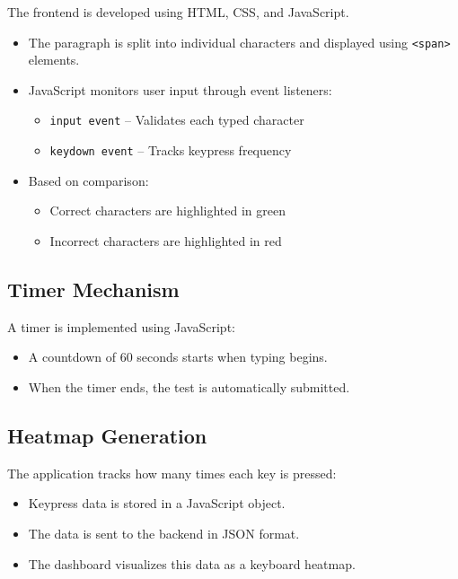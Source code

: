 \documentclass[a4paper,12pt]{article}
\begin{document}
The frontend is developed using HTML, CSS, and JavaScript.

\begin{itemize}
    \item The paragraph is split into individual characters and displayed using \texttt{<span>} elements.
    
    \item JavaScript monitors user input through event listeners:
    \begin{itemize}
        \item \texttt{input event} – Validates each typed character
        \item \texttt{keydown event} – Tracks keypress frequency
    \end{itemize}
    
    \item Based on comparison:
    \begin{itemize}
        \item Correct characters are highlighted in green
        \item Incorrect characters are highlighted in red
    \end{itemize}
\end{itemize}

\subsection{Timer Mechanism}

A timer is implemented using JavaScript:

\begin{itemize}
    \item A countdown of 60 seconds starts when typing begins.
    \item When the timer ends, the test is automatically submitted.
\end{itemize}

\subsection{Heatmap Generation}

The application tracks how many times each key is pressed:

\begin{itemize}
    \item Keypress data is stored in a JavaScript object.
    \item The data is sent to the backend in JSON format.
    \item The dashboard visualizes this data as a keyboard heatmap.
\end{itemize}
\end{document}
